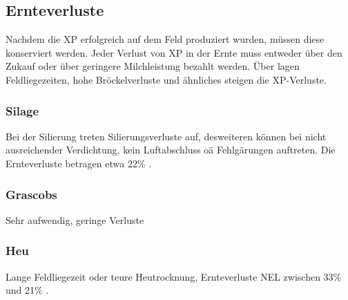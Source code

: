 \subsection{Ernteverluste}
\label{subsec:Lit:Ernte}

Nachdem die \ac{XP} erfolgreich auf dem Feld produziert wurden, müssen diese konserviert werden.
Jeder Verlust von \ac{XP} in der Ernte muss entweder über den Zukauf oder über geringere Milchleistung bezahlt werden.
Über lagen Feldliegezeiten, hohe Bröckelverluste und ähnliches steigen die \ac{XP}-Verluste.

\subsubsection{Silage}
\label{subsub:Silage}
Bei der Silierung treten Silierungsverluste auf, desweiteren können bei nicht ausreichender Verdichtung, kein Luftabschluss oä Fehlgärungen auftreten.
Die Ernteverluste betragen etwa 22\% \parencite[30]{fritz2018wirtschaftliche}.


\subsubsection{Grascobs}
\label{subsub:Peletts}
Sehr aufwendig, geringe Verluste \parencite[12f]{engel2013protein}

\subsubsection{Heu}
\label{subsub:Heu}
Lange Feldliegezeit oder teure Heutrocknung, Ernteverluste \ac{NEL} zwischen 33\% und 21\% \parencite[30]{fritz2018wirtschaftliche}.


